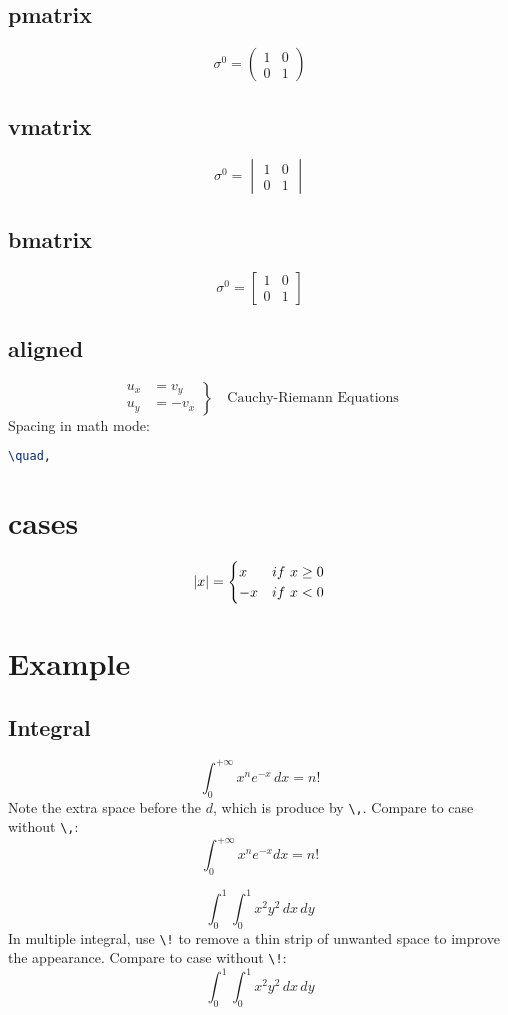 \subsection{pmatrix}
\[
    \sigma^{0} =
    \begin{pmatrix}
	1   & 0	\\
	0   & 1
    \end{pmatrix}
\]
\subsection{vmatrix}
\[
    \sigma^{0} =
    \begin{vmatrix}
	1   & 0	\\
	0   & 1
    \end{vmatrix}
\]
\subsection{bmatrix}
\[ \sigma^{0} =
    \begin{bmatrix}
	1   & 0	\\
	0   & 1
    \end{bmatrix}
\]
\subsection{aligned}
\begin{equation*}
    \left.  %
    \begin{aligned}
	u_x & = v_y \\
	u_y & = -v_x
    \end{aligned}
    \right\} \quad \text{Cauchy-Riemann Equations}
\end{equation*}
Spacing in math mode:
\begin{lstlisting}[language=TeX]
\quad,
\end{lstlisting}

\section{cases}
\[
    |x| = 
    \begin{cases}
	x	&if\ x \geq 0	\cr
	-x	&if\ x < 0	\cr
    \end{cases}
    \]

\section{Example}

\subsection{Integral}
\[
    \int_0^{+\infty} x^n e^{-x}\,dx = n!
    \]
Note the extra space before the $d$, which is produce by \verb|\,|.
Compare to case without \verb|\,|:
\[
    \int_0^{+\infty} x^n e^{-x} dx = n!
    \]

\[
    \int_0^1 \! \int_0^1 x^2 y^2 \,dx\,dy
    \]
In multiple integral, use \verb|\!| to remove a thin strip of unwanted space
to improve the appearance. Compare to case without \verb|\!|:
\[
    \int_0^1 \int_0^1 x^2 y^2 \,dx\,dy
    \]

